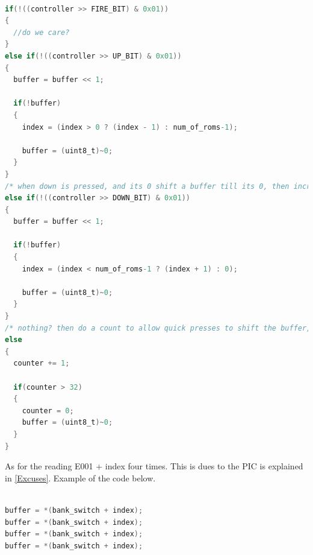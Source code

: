 \documentclass{article}
\begin{document}
  \begin{lstlisting}[language=C]

if(!((controller >> FIRE_BIT) & 0x01))
{
  //do we care?
}
else if(!((controller >> UP_BIT) & 0x01))
{
  buffer = buffer << 1;

  if(!buffer)
  {
    index = (index > 0 ? (index - 1) : num_of_roms-1);

    buffer = (uint8_t)~0;
  }
}
/* when down is pressed, and its 0 shift a buffer till its 0, then increment index to move the highlight down the screen */
else if(!((controller >> DOWN_BIT) & 0x01))
{
  buffer = buffer << 1;

  if(!buffer)
  {
    index = (index < num_of_roms-1 ? (index + 1) : 0);

    buffer = (uint8_t)~0;
  }
}
/* nothing? then do a count to allow quick presses to shift the buffer, and if its been to long, clear everything out */
else
{
  counter += 1;

  if(counter > 32)
  {
    counter = 0;
    buffer = (uint8_t)~0;
  }
}

  \end{lstlisting}

  \par
  As for the reading E001 + index four times. This is dues to the PIC is explained in \ref{Excuses}. Example of the code below.

  \begin{lstlisting}[language=C]

buffer = *(bank_switch + index);
buffer = *(bank_switch + index);
buffer = *(bank_switch + index);
buffer = *(bank_switch + index);
  \end{lstlisting}
\end{document}
